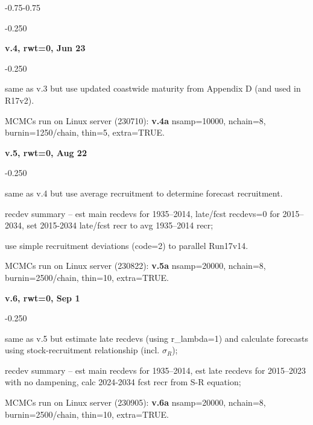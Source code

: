 \begin{itemize_csas}{-0.75}{-0.75}
\begin{itemize_csas}{-0.25}{0}
	\end{itemize_csas}
	\item \textbf{v.4, rwt=0, Jun 23}
	\begin{itemize_csas}{-0.25}{0}
		\item same as v.3 but use updated coastwide maturity from Appendix D (and used in R17v2).
		\item MCMCs run on Linux server (230710): \textbf{v.4a} nsamp=10000, nchain=8, burnin=1250/chain, thin=5, extra=TRUE.
	\end{itemize_csas}
	\item \textbf{v.5, rwt=0, Aug 22}
	\begin{itemize_csas}{-0.25}{0}
		\item same as v.4 but use average recruitment to determine forecast recruitment.
		\item recdev summary -- est main recdevs for 1935--2014, late/fcst recdevs=0 for 2015--2034, set 2015-2034 late/fcst recr to avg 1935--2014 recr;
		\item use simple recruitment deviations (code=2) to parallel Run17v14.
		\item MCMCs run on Linux server (230822): \textbf{v.5a} nsamp=20000, nchain=8, burnin=2500/chain, thin=10, extra=TRUE.
	\end{itemize_csas}
	\item \textbf{v.6, rwt=0, Sep 1}
	\begin{itemize_csas}{-0.25}{0}
		\item same as v.5 but estimate late recdevs (using r\_lambda=1) and calculate forecasts using stock-recruitment relationship (incl. $\sigma_R$);
		\item recdev summary -- est main recdevs for 1935--2014, est late recdevs for 2015--2023 with no dampening, calc 2024-2034 fcst recr from S-R equation;
		\item MCMCs run on Linux server (230905): \textbf{v.6a} nsamp=20000, nchain=8, burnin=2500/chain, thin=10, extra=TRUE.
	\end{itemize_csas}
\end{itemize_csas}

